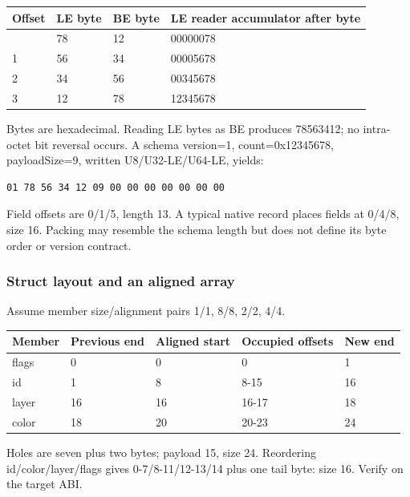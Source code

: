 {\def\LTcaptype{none} %
\begin{longtable}[]{@{}llll@{}}
\toprule\noalign{}
Offset & LE byte & BE byte & LE reader accumulator after byte \\
\midrule\noalign{}
\endhead
\bottomrule\noalign{}
\endlastfoot
0 & 78 & 12 & 00000078 \\
1 & 56 & 34 & 00005678 \\
2 & 34 & 56 & 00345678 \\
3 & 12 & 78 & 12345678 \\
\end{longtable}
}

Bytes are hexadecimal. Reading LE bytes as BE produces 78563412; no intra-octet bit reversal occurs. A schema version=1, count=0x12345678, payloadSize=9, written U8/U32-LE/U64-LE, yields:

\begin{verbatim}
01 78 56 34 12 09 00 00 00 00 00 00 00
\end{verbatim}

Field offsets are 0/1/5, length 13. A typical native record places fields at 0/4/8, size 16. Packing may resemble the schema length but does not define its byte order or version contract.

\subsubsection{Struct layout and an aligned array}\label{appendix-92ff77d4dfdc-struct-layout-and-an-aligned-array}

Assume member size/alignment pairs 1/1, 8/8, 2/2, 4/4.

{\def\LTcaptype{none} %
\begin{longtable}[]{@{}lllll@{}}
\toprule\noalign{}
Member & Previous end & Aligned start & Occupied offsets & New end \\
\midrule\noalign{}
\endhead
\bottomrule\noalign{}
\endlastfoot
flags & 0 & 0 & 0 & 1 \\
id & 1 & 8 & 8-15 & 16 \\
layer & 16 & 16 & 16-17 & 18 \\
color & 18 & 20 & 20-23 & 24 \\
\end{longtable}
}

Holes are seven plus two bytes; payload 15, size 24. Reordering id/color/layer/flags gives 0-7/8-11/12-13/14 plus one tail byte: size 16. Verify on the target ABI.

